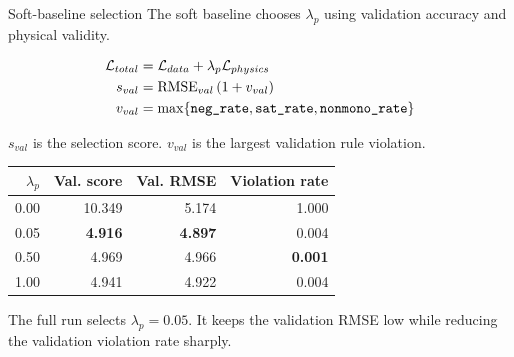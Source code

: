 \documentclass[aspectratio=169,10pt]{beamer}
\newcommand{\smallgray}[1]{\textcolor{projectGray}{#1}}
\newcommand{\best}[1]{\textbf{\textcolor{projectTeal}{#1}}}
\begin{document}
\begin{frame}{Soft-baseline selection}
  \smallgray{The soft baseline chooses \(\lambda_p\) using validation accuracy and physical validity.}

  \vspace{0.2cm}
  \begin{align*}
    \mathcal{L}_{total}
     & = \mathcal{L}_{data} + \lambda_p \mathcal{L}_{physics}                                      \\
    s_{val}
     & = \mathrm{RMSE}_{val}\left(1 + v_{val}\right)                                               \\
    v_{val}
     & = \max\{\text{\texttt{neg\_rate}},\text{\texttt{sat\_rate}},\text{\texttt{nonmono\_rate}}\}
  \end{align*}

  \vspace{-0.15cm}
  \smallgray{\(s_{val}\) is the selection score. \(v_{val}\) is the largest validation rule violation.}

  \vspace{0.08cm}
  \begin{table}
    \centering
    \scriptsize
    \begin{tabular}{rrrr}
      \toprule
      \(\lambda_p\) & \textbf{Val. score} & \textbf{Val. RMSE} & \textbf{Violation rate} \\
      \midrule
      0.00          & 10.349              & 5.174              & 1.000                   \\
      0.05          & \best{4.916}        & \best{4.897}       & 0.004                   \\
      0.50          & 4.969               & 4.966              & \best{0.001}            \\
      1.00          & 4.941               & 4.922              & 0.004                   \\
      \bottomrule
    \end{tabular}
  \end{table}

  \vspace{0.15cm}
  \smallgray{The full run selects \(\lambda_p=0.05\). It keeps the validation RMSE low while reducing the validation violation rate sharply.}
\end{frame}
\end{document}
